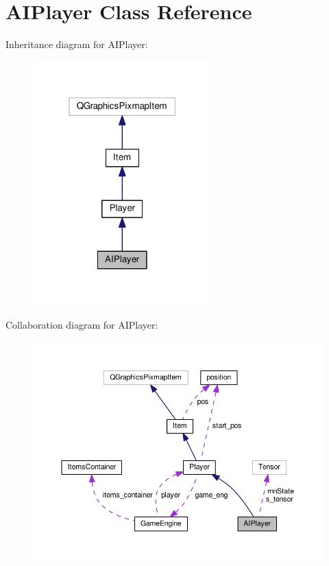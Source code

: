 \hypertarget{class_a_i_player}{}\section{A\+I\+Player Class Reference}
\label{class_a_i_player}


Inheritance diagram for A\+I\+Player\+:
\nopagebreak
\begin{figure}[H]
\begin{center}
\leavevmode
\includegraphics[width=196pt]{class_a_i_player__inherit__graph}
\end{center}
\end{figure}


Collaboration diagram for A\+I\+Player\+:
\nopagebreak
\begin{figure}[H]
\begin{center}
\leavevmode
\includegraphics[width=350pt]{class_a_i_player__coll__graph}
\end{center}
\end{figure}
